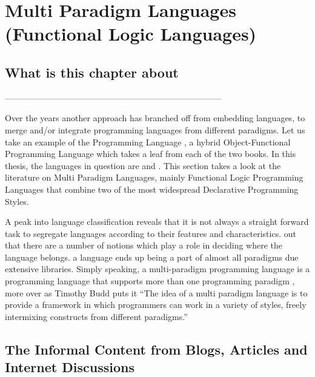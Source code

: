 \documentclass[thesis-solanki.tex]{subfiles}
\begin{document}
\chapter{Multi Paradigm Languages (Functional Logic Languages)}\label{chap:multiparadigm}


\section{What is this chapter about}

-----------------------------------------------------------------------------


Over the years another approach has branched off from embedding languages, to merge and/or integrate programming
languages from different paradigms.
Let us take an example of the  Programming Language \cite{website:scala}, a hybrid
Object-Functional Programming Language which takes a leaf from each of the two books.
In this thesis, the languages in question are  and .
This section takes a look at the literature on Multi Paradigm Languages, mainly Functional Logic Programming
Languages that combine two of the most widespread Declarative Programming Styles.

A peak into language classification reveals that it is not always a straight forward task to segregate languages
according to their features and characteristics.
 out that there are a number of notions which play a role in deciding where the language
belongs. 
 a language ends up being a part of almost all paradigms due extensive libraries.
Simply speaking, a multi-paradigm programming language is a programming language that supports more than one
programming paradigm \cite{Krishnamurthi:2008:TPL:1480828.1480846}, more over\yyy{}{\Large,} as Timothy Budd puts it
\cite{website:wikimultiparadigm} ``The idea of a multi paradigm language is to provide a framework in
which programmers can work in a variety of styles, freely intermixing constructs from different
paradigms.''


\section{The Informal Content from Blogs, Articles and Internet Discussions}
  
\end{document}
